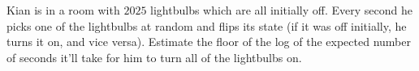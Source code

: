 Kian is in a room with $2025$ lightbulbs which are all initially off. Every second he picks one of the lightbulbs at random and flips its state (if it was off initially, he turns it on, and vice versa). Estimate the floor of the log of the expected number of seconds it'll take for him to turn all of the lightbulbs on.
